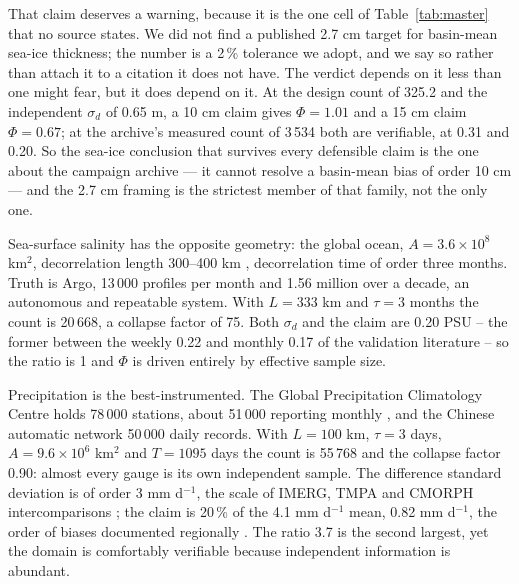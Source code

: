 \documentclass[preprint,12pt,authoryear]{elsarticle}
\begin{document}
That claim deserves a warning, because it is the one cell of Table~\ref{tab:master}
that no source states. We did not find a published 2.7 cm target for basin-mean
sea-ice thickness; the number is a 2\,\% tolerance we adopt, and we say so rather
than attach it to a citation it does not have. The verdict depends on it less than
one might fear, but it does depend on it. At the design count of 325.2 and the
independent $\sigma_d$ of 0.65 m, a 10 cm claim gives $\Phi = 1.01$ and a 15 cm
claim $\Phi = 0.67$; at the archive's measured count of 3\,534 both are verifiable,
at 0.31 and 0.20. So the sea-ice conclusion that survives every defensible claim is
the one about the campaign archive --- it cannot resolve a basin-mean bias of order
10 cm --- and the 2.7 cm framing is the strictest member of that family, not the
only one.

Sea-surface salinity has the opposite geometry: the global ocean, $A = 3.6\times10^{8}$ km$^2$, decorrelation length 300--400 km \citep{vinogradova2013small,bingham2012interpolation}, decorrelation time of order three months. Truth is Argo, 13\,000 profiles per month and 1.56 million over a decade, an autonomous and repeatable system. With $L = 333$ km and $\tau = 3$ months the count is 20\,668, a collapse factor of 75. Both $\sigma_d$ and the claim are 0.20 PSU -- the former between the weekly 0.22 and monthly 0.17 of the validation literature \citep{meissner2011remote,bingham2012interpolation} -- so the ratio is 1 and $\Phi$ is driven entirely by effective sample size.

Precipitation is the best-instrumented. The Global Precipitation Climatology Centre holds 78\,000 stations, about 51\,000 reporting monthly \citep{gpcc_v2022}, and the Chinese automatic network 50\,000 daily records. With $L = 100$ km, $\tau = 3$ days, $A = 9.6\times10^{6}$ km$^2$ and $T = 1095$ days the count is 55\,768 and the collapse factor 0.90: almost every gauge is its own independent sample. The difference standard deviation is of order 3 mm d$^{-1}$, the scale of IMERG, TMPA and CMORPH intercomparisons \citep{huffman2007trmm,kidd2011status,tan2019imerg,huffman2020integrated,beck2017global,beck2019daily,sun2018review}; the claim is 20\,\% of the 4.1 mm d$^{-1}$ mean, 0.82 mm d$^{-1}$, the order of biases documented regionally \citep{li2018evaluation}. The ratio 3.7 is the second largest, yet the domain is comfortably verifiable because independent information is abundant.
\end{document}
